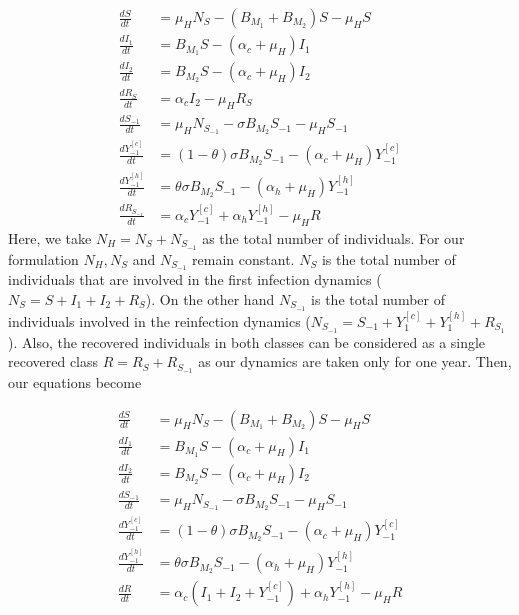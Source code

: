 \begin{equation}\label{eqn:model_two_strains1}
	\begin{aligned}
		\frac{dS}{dt} &=
			\mu_HN_S - (B_{M_1} + B_{M_2}) S
			-\mu_H S
		\\
		\frac{dI_1}{dt} &=
			B_{M_1} S
			-(\alpha_c + \mu_H) I_1
		\\
		\frac{dI_2}{dt} &=
			B_{M_2} S
			-(\alpha_c + \mu_H)I_2
		\\
        \frac{dR_S}{dt}&=\alpha_c I_2-\mu_H R_S
		\\
		\frac{dS_{-1}}{dt} &=
			\mu_HN_{S_{-1}}- \sigma B_{M_2} S_{-1}-\mu_H S_{-1}
		\\
		\frac{dY_{-1} ^{[c]} }{dt} &=
			(1 - \theta) \sigma B_{M_2} S_{-1}
			-(\alpha_c + \mu_H) Y_{-1} ^ {[c]}
		\\
		\frac{dY_{-1}^{[h]}}{dt} &=
			\theta \sigma B_{M_2} S_{-1}
			-(\alpha_h + \mu_H)Y_{-1} ^{[h]} 
		\\
		\frac{dR_{S_{-1}}}{dt} &= 
			\alpha_c Y_{-1} ^{[c]}
			+ \alpha_h Y_{-1} ^ {[h]} - \mu_H R
	\end{aligned}
\end{equation}
Here, we take $N_H=N_S+N_{S_{-1}}$ as the total number of individuals. For our formulation $N_H, N_S$ and $N_{S_{-1}}$ remain constant. $N_S$ is the total number of individuals that are involved in the first infection dynamics ($N_S = S +I_1+I_2+R_S$). On the other hand $N_{S_{-1}}$ is the total number of individuals involved in the reinfection dynamics ($N_{S_{-1}}=S_{-1}+Y_1^{[c]}+ Y_1^{[h]}+R_{S_1}$). Also, the recovered individuals in both classes can be considered as a single recovered class $R=R_S+R_{S_{-1}}$ as our dynamics are taken only for one year. Then, our equations become

\begin{equation}\label{eqn:model_two_strains2}
	\begin{aligned}
		\frac{dS}{dt} &=
			\mu_HN_S - (B_{M_1} + B_{M_2}) S
			-\mu_H S
		\\
		\frac{dI_1}{dt} &=
			B_{M_1} S
			-(\alpha_c + \mu_H) I_1
		\\
		\frac{dI_2}{dt} &=
			B_{M_2} S
			-(\alpha_c + \mu_H)I_2
		\\
		\frac{dS_{-1}}{dt} &=
			\mu_HN_{S_{-1}}- \sigma B_{M_2} S_{-1}-\mu_H S_{-1}
		\\
		\frac{dY_{-1} ^{[c]} }{dt} &=
			(1 - \theta) \sigma B_{M_2} S_{-1}
			-(\alpha_c + \mu_H) Y_{-1} ^ {[c]}
		\\
		\frac{dY_{-1}^{[h]}}{dt} &=
			\theta \sigma B_{M_2} S_{-1}
			-(\alpha_h + \mu_H)Y_{-1} ^{[h]} 
		\\
		\frac{dR}{dt} &= 
			\alpha_c 
				\left(
					I_1 + I_2 + Y_{-1} ^{[c]}
				\right)
			+ \alpha_h Y_{-1} ^ {[h]} - \mu_H R
	\end{aligned}
\end{equation}







